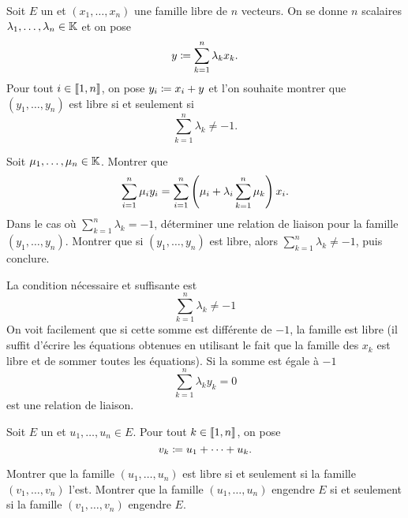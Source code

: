 \documentclass{magnolia}
\begin{document}
Soit $E$ un \Kev et $(x_1,\ldots,x_n)$ une famille libre de $n$ vecteurs. On se
donne $n$ scalaires $\lambda_1,\ldots,\lambda_n\in\mathbb{K}$ et on pose
\[y\coloneqq\sum_{k=1}^n \lambda_k x_k.\]
Pour tout $i\in\left\llbracket 1,n\right\rrbracket$, on pose $y_i\coloneqq x_i+y$ et l'on souhaite montrer que
$(y_1,\ldots,y_n)$ est libre si et seulement si
\[\sum_{k=1}^n \lambda_k \neq -1.\]
\begin{questions}
\question Soit $\mu_1,\ldots,\mu_n\in\mathbb{K}$. Montrer que
  \[\sum_{i=1}^n \mu_i y_i =\sum_{i=1}^n \left(\mu_i + \lambda_i \sum_{k=1}^n \mu_k\right)x_i.\]
\question Dans le cas où $\sum_{k=1}^n \lambda_k= -1$, déterminer une relation de liaison
  pour la famille $(y_1,\ldots,y_n)$.
\question Montrer que si $(y_1,\ldots,y_n)$ est libre, alors
  $\sum_{k=1}^n \lambda_k\neq -1$, puis conclure.

\end{questions}
\begin{sol}
La condition nécessaire et suffisante est
\[\sum_{k=1}^n \lambda_k\neq -1\]
On voit facilement que si cette somme est différente de $-1$, la famille est
libre (il suffit d'écrire les équations obtenues en utilisant le fait que la
famille des $x_k$ est libre et de sommer toutes les équations). Si la somme
est égale à $-1$
\[\sum_{k=1}^n \lambda_k y_k=0\]
est une relation de liaison.
\end{sol}







Soit $E$ un \Kev et $u_1,\ldots,u_n\in E$. Pour tout $k\in\left\llbracket 1,n\right\rrbracket$, on pose
\[v_k\coloneqq u_1+\cdots+u_k.\]
\begin{questions}
\question Montrer que la famille $(u_1,\ldots,u_n)$ est libre si et seulement si
  la famille $(v_1,\ldots,v_n)$ l'est.
\question Montrer que la famille $(u_1,\ldots,u_n)$ engendre $E$ si et seulement si
  la famille $(v_1,\ldots,v_n)$ engendre $E$.
\end{questions}
\end{document}
